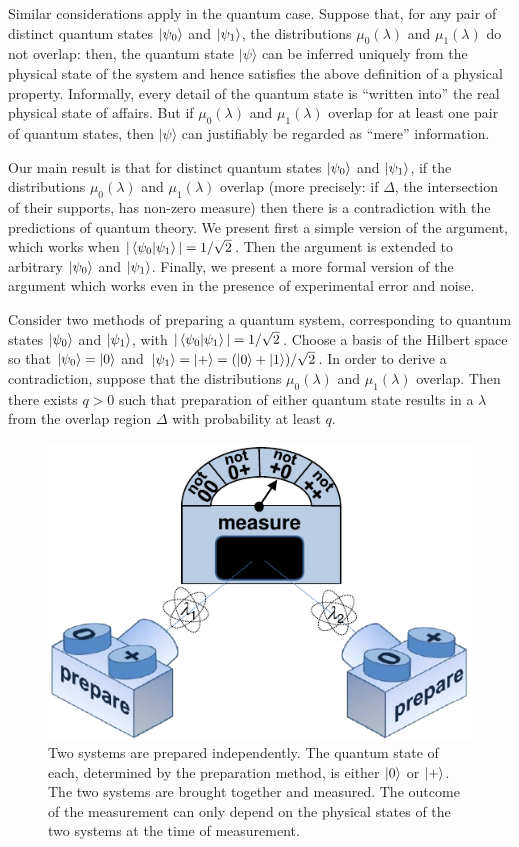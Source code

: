 \documentclass[amsmath,amssymb,superscriptaddress,pra,12pt]{revtex4-1}
\begin{document}
Similar considerations apply in the quantum case. Suppose that, for any pair of distinct quantum states $\ket{\psi_0}$ and $\ket{\psi_1}$, the distributions $\mu_0(\lambda)$ and $\mu_1(\lambda)$ do not overlap: then, the quantum state $|\psi\rangle$ can be inferred uniquely from the physical state of the system and hence satisfies the above definition of a physical property. Informally, every detail of the quantum state is ``written into'' the real physical state of affairs. But if $\mu_0(\lambda)$ and $\mu_1(\lambda)$ overlap for at least one pair of quantum states, then $|\psi\rangle$ can justifiably be regarded as ``mere'' information.

Our main result is that for distinct quantum states $\ket{\psi_0}$ and $\ket{\psi_1}$, if the distributions $\mu_0(\lambda)$ and $\mu_1(\lambda)$ overlap (more precisely: if $\Delta$, the intersection of their supports, has non-zero measure) then there is a contradiction with the predictions of quantum theory. We present first a simple version of the argument, which works when $|\braket{\psi_0|\psi_1}| = 1/\sqrt{2}$. Then the argument is extended to arbitrary $\ket{\psi_0}$ and $\ket{\psi_1}$. Finally, we present a more formal version of the argument which works even in the presence of experimental error and noise.

Consider two methods of preparing a quantum system, corresponding to quantum states $\ket{\psi_0}$ and $\ket{\psi_1}$, with $|\braket{\psi_0|\psi_1}| = 1/\sqrt{2}$. Choose a basis of the Hilbert space so that $\ket{\psi_0} = \ket{0}$ and $\ket{\psi_1} = \ket{+} = (\ket{0} + \ket{1})/\sqrt 2$. In order to derive a contradiction, suppose that the distributions $\mu_0(\lambda)$ and $\mu_1(\lambda)$ overlap. Then there exists $q>0$ such that preparation of either quantum state results in a $\lambda$ from the overlap region $\Delta$ with probability at least $q$.

\begin{figure}
  \includegraphics[width=\columnwidth]{figs/nogofig2}
  \caption{Two systems are prepared independently. The quantum state of each, determined by the preparation method, is either $\ket{0}$ or $\ket{+}$. The two systems are brought together and measured. The outcome of the measurement can only depend on the physical states of the two systems at the time of measurement.}
  \label{fig2}
\end{figure}
\end{document}

